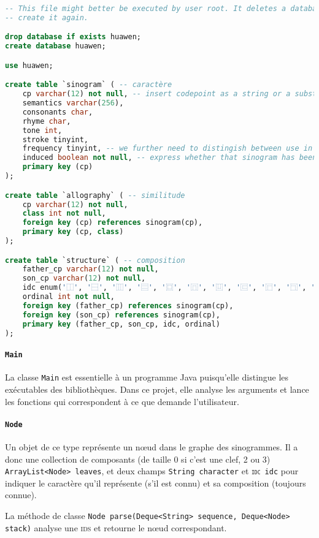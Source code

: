 \documentclass[12pt,onecolumn]{article}
\begin{document}
\begin{lstlisting}[caption={huawen.sql},language=SQL]
-- This file might better be executed by user root. It deletes a database then
-- create it again.

drop database if exists huawen;
create database huawen;

use huawen;

create table `sinogram` ( -- caractère
	cp varchar(12) not null, -- insert codepoint as a string or a substitute.
	semantics varchar(256),
	consonants char,
	rhyme char,
	tone int,
	stroke tinyint,
	frequency tinyint, -- we further need to distingish between use in speech or use in other sinograms
	induced boolean not null, -- express whether that sinogram has been added properly or induced
	primary key (cp)
);

create table `allography` ( -- similitude
	cp varchar(12) not null,
	class int not null,
	foreign key (cp) references sinogram(cp),
	primary key (cp, class)
);

create table `structure` ( -- composition
	father_cp varchar(12) not null,
	son_cp varchar(12) not null,
	idc enum('⿰', '⿱', '⿲', '⿳', '⿴', '⿵', '⿶', '⿷', '⿸', '⿹', '⿺', '⿻'), -- null allowed if radical
	ordinal int not null,
	foreign key (father_cp) references sinogram(cp),
	foreign key (son_cp) references sinogram(cp),
	primary key (father_cp, son_cp, idc, ordinal)
);
\end{lstlisting}

\paragraph{\texttt{Main}} La classe \texttt{Main} est essentielle à un programme Java puisqu'elle distingue les exécutables des bibliothèques. Dans ce projet, elle analyse les arguments et lance les fonctions qui correspondent à ce que demande l'utilisateur.

\paragraph{\texttt{Node}} Un objet de ce type représente un nœud dans le graphe des sinogrammes. Il a donc une collection de composants (de taille 0 si c'est une clef, 2 ou 3) \texttt{ArrayList<Node> leaves}, et deux champs \texttt{String character} et \texttt{\textsc{idc} idc} pour indiquer le caractère qu'il représente (s'il est connu) et sa composition (toujours connue).

La méthode de classe \texttt{Node parse(Deque<String> sequence, Deque<Node> stack)} analyse une \textsc{ids} et retourne le nœud correspondant.
\end{document}
